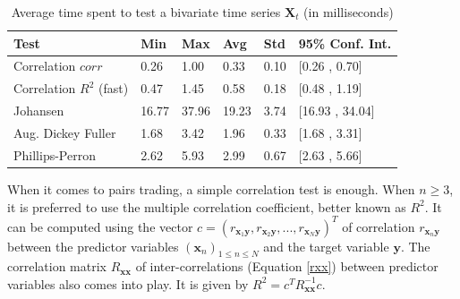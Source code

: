 \documentclass[11pt,a4,twosided,singlespacing,titlepagenumber=on]{scrreprt}
\numberwithin{equation}{chapter} %
\theoremstyle{remark}
\newcommand{\matr}[1]{\mathbf{#1}}
\begin{document}
\begin{table}[H]
\centering
\begin{tabular}{llllll}
\hline
\multicolumn{1}{|l|}{Test}     & \multicolumn{1}{|l|}{Min} & \multicolumn{1}{|l|}{Max} & \multicolumn{1}{|l|}{Avg} & \multicolumn{1}{|l|}{Std} & \multicolumn{1}{|l|}{95\% Conf. Int.} \\ \hline
Correlation $corr$						 &  0.26  & 1.00  & 0.33  & 0.10 & [0.26 , 0.70]\\
Correlation $R^2$ (fast)       &  0.47  & 1.45  & 0.58  & 0.18 & [0.48 , 1.19]\\
Johansen                       &  16.77 & 37.96 & 19.23 & 3.74 & [16.93 , 34.04]\\
Aug. Dickey Fuller             &  1.68  & 3.42  & 1.96  & 0.33 & [1.68 , 3.31]\\
Phillips-Perron                &  2.62  & 5.93  & 2.99  & 0.67 & [2.63 , 5.66]\\
\hline
\end{tabular}
\caption{Average time spent to test a bivariate time series $\matr{X}_t$ (in milliseconds)}
\label{time_spent_test_bivariate}
\end{table}

When it comes to pairs trading, a simple correlation test is enough. When $n \geq 3$, it is preferred to use the multiple correlation coefficient, better known as $R^2$. It can be computed using the vector $c = (r_{\matr{x}_1\matr{y}}, r_{\matr{x}_2\matr{y}},...,r_{\matr{x}_N\matr{y}})^T$ of correlation $r_{\matr{x}_n\matr{y}}$ between the predictor variables $(\matr{x}_n)_{1 \leq n \leq N}$ and the target variable $\matr{y}$. The correlation matrix $R_{\matr{x}\matr{x}}$ of inter-correlations (Equation \ref{rxx}) between predictor variables also comes into play. It is given by $R^2 = c^T R_{\matr{x}\matr{x}}^{-1}c$.
\end{document}
